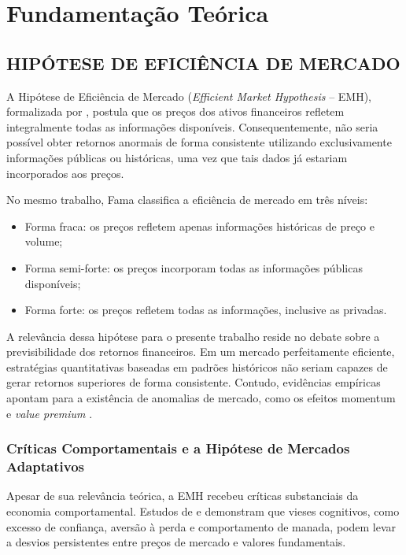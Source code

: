 \documentclass{eic-bcc-tcc}
\begin{document}
\chapter{Fundamentação Teórica}
\label{cha:fundamentacao}

\section{HIPÓTESE DE EFICIÊNCIA DE MERCADO}

A Hipótese de Eficiência de Mercado (\textit{Efficient Market Hypothesis} -- EMH), formalizada por \citep{Fama1970}, postula que os preços dos ativos financeiros refletem integralmente todas as informações disponíveis. Consequentemente, não seria possível obter retornos anormais de forma consistente utilizando exclusivamente informações públicas ou históricas, uma vez que tais dados já estariam incorporados aos preços.

No mesmo trabalho, Fama classifica a eficiência de mercado em três níveis:

\begin{itemize}
\item Forma fraca: os preços refletem apenas informações históricas de preço e volume;
\item Forma semi-forte: os preços incorporam todas as informações públicas disponíveis;
\item Forma forte: os preços refletem todas as informações, inclusive as privadas.
\end{itemize}

A relevância dessa hipótese para o presente trabalho reside no debate sobre a previsibilidade dos retornos financeiros. Em um mercado perfeitamente eficiente, estratégias quantitativas baseadas em padrões históricos não seriam capazes de gerar retornos superiores de forma consistente. Contudo, evidências empíricas apontam para a existência de anomalias de mercado, como os efeitos momentum e \textit{value premium} \citep{FamaFrench1992, JegadeeshTitman1993}.

\subsection{Críticas Comportamentais e a Hipótese de Mercados Adaptativos}

Apesar de sua relevância teórica, a EMH recebeu críticas substanciais da economia comportamental. Estudos de \citep{Shiller2000} e \citep{Thaler1993} demonstram que vieses cognitivos, como excesso de confiança, aversão à perda e comportamento de manada, podem levar a desvios persistentes entre preços de mercado e valores fundamentais.
\end{document}
